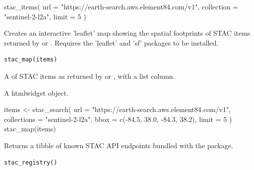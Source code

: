 \documentclass[a4paper]{book}
\begin{document}
%
\begin{Examples}
\begin{ExampleCode}


stac_items(
  url = "https://earth-search.aws.element84.com/v1",
  collection = "sentinel-2-l2a",
  limit = 5
)


\end{ExampleCode}
\end{Examples}
%
\begin{Description}
Creates an interactive 'leaflet' map showing the spatial footprints of
STAC items returned by  or . Requires the
'leaflet' and 'sf' packages to be installed.
\end{Description}
%
\begin{Usage}
\begin{verbatim}
stac_map(items)
\end{verbatim}
\end{Usage}
%
\begin{Arguments}
\begin{ldescription}
\item[\code{items}] A  of STAC items as returned by
 or , with a  list column.
\end{ldescription}
\end{Arguments}
%
\begin{Value}
A  htmlwidget object.
\end{Value}
%
\begin{Examples}
\begin{ExampleCode}


items <- stac_search(
  url = "https://earth-search.aws.element84.com/v1",
  collections = "sentinel-2-l2a",
  bbox = c(-84.5, 38.0, -84.3, 38.2),
  limit = 5
)
stac_map(items)


\end{ExampleCode}
\end{Examples}
%
\begin{Description}
Returns a tibble of known STAC API endpoints bundled with the package.
\end{Description}
%
\begin{Usage}
\begin{verbatim}
stac_registry()
\end{verbatim}
\end{Usage}
\end{document}
